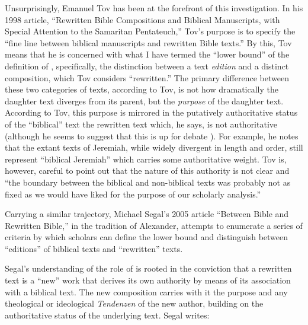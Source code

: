 Unsurprisingly, Emanuel Tov has been at the forefront of this investigation. In his 1998 article, ``Rewritten Bible Compositions and Biblical Manuscripts, with Special Attention to the Samaritan Pentateuch,'' Tov's purpose is to specify the ``fine line between biblical manuscripts and rewritten Bible texts.''%
    \autocite[334]{tov_dsd1998}
By this, Tov means that he is concerned with what I have termed the ``lower bound'' of the definition of \rwb, specifically, the distinction between a text \emph{edition} and a distinct composition, which Tov considers ``rewritten.'' The primary difference between these two categories of texts, according to Tov, is not how dramatically the daughter text diverges from its parent, but the \emph{purpose} of the daughter text.%
    \autocite[334]{tov_dsd1998}
According to Tov, this purpose is mirrored in the putatively authoritative status of the ``biblical'' text \visavis the rewritten text which, he says, is not authoritative (although he seems to suggest that this is up for debate%
    \autocite[337]{tov_dsd1998}%
). For example, he notes that the extant texts of Jeremiah, while widely divergent in length and order, still represent ``biblical Jeremiah'' which carries some authoritative weight. Tov is, however, careful to point out that the nature of this authority is not clear and ``the boundary between the biblical and non-biblical texts was probably not as fixed as we would have liked for the purpose of our scholarly analysis.''%
    \autocite[335]{tov_dsd1998} 

Carrying a similar trajectory, Michael Segal's 2005 article ``Between Bible and Rewritten Bible,'' in the tradition of Alexander, attempts to enumerate a series of criteria by which scholars can define the lower bound and distinguish between ``editions'' of biblical texts and ``rewritten'' texts. 

Segal's understanding of the role of \rwb is rooted in the conviction that a rewritten text is a ``new'' work that derives its own authority by means of its association with a biblical text. The new composition carries with it the purpose and any theological or ideological \emph{Tendenzen} of the new author, building on the authoritative status of the underlying text.%
    \autocite[11]{segal_henze2005} Segal writes: 

